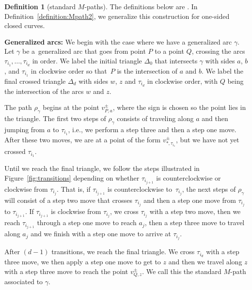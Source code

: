 \documentclass[pdftex]{sigma}
\numberwithin{equation}{section}
\theoremstyle{definition}
\newtheorem{Definition}[Theorem]{Definition}
\begin{document}
\begin{Definition}[standard $M$-paths]\label{definition:Mpath}
The definitions below are \cite[Definitions 5.9 and 5.11]{MW13}. In Definition~\ref{definition:Mpath2}, we generalize this construction for one-sided closed curves.

\textbf{Generalized arcs:} We begin with the case where we have a generalized arc $\gamma$. Let $\gamma$ be a~generalized arc that goes from point $P$ to a point $Q$, crossing the arcs $\tau_{i_1},\ldots,\tau_{i_d}$ in order. We label the initial triangle $\Delta_0$ that intersects $\gamma$ with sides $a$, $b$, and $\tau_{i_1}$ in clockwise order so that~$P$ is the intersection of $a$ and $b$. We label the final crossed triangle $\Delta_d$ with sides $w$, $z$ and $\tau_{i_d}$ in clockwise order, with $Q$ being the intersection of the arcs $w$ and $z$.

The path $\rho_{\gamma}$ begins at the point $v^{\pm}_{P,a}$, where the sign is chosen so the point lies in the triangle. The first two steps of $\rho_{\gamma}$ consists of traveling along $a$ and then jumping from $a$ to $\tau_{i_1}$, i.e., we perform a step three and then a step one move. After these two moves, we are at a point of the form $v^{\pm}_{*, \tau_{i_1}}$, but we have not yet crossed $\tau_{i_1}$.

Until we reach the final triangle, we follow the steps illustrated in Figure~\ref{fig:transitions} depending on whether $\tau_{i_{j+1}}$ is counterclockwise or clockwise from $\tau_{i_j}$. That is, if $\tau_{i_{j+1}}$ is counterclockwise to~$\tau_{i_j}$, the next steps of $\rho_{\gamma}$ will consist of a step two move that crosses $\tau_{i_j}$ and then a step one move from $\tau_{i_j}$ to $\tau_{i_{j+1}}$. If $\tau_{i_{j+1}}$ is clockwise from $\tau_{i_j}$, we cross $\tau_{i_j}$ with a step two move, then we reach $\tau_{i_{j+1}}$ through a step one move to reach $a_j$, then a step three move to travel along $a_j$ and we finish with a step one move to arrive at $\tau_{i_j}$.

After $(d-1)$ transitions, we reach the final triangle. We cross $\tau_{i_d}$ with a step three move, we then apply a step one move to get to $z$ and then we travel along $z$ with a step three move to reach the point $v^{\pm}_{Q, z}$. We call this the standard $M$-path associated to $\gamma$.


\end{Definition}
\end{document}
